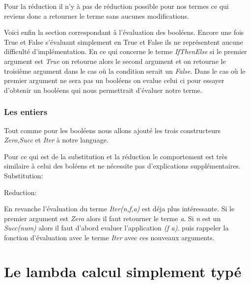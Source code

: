 \documentclass {article}
\newcommand{\codefrom}[3]
           {}
\theoremstyle{definition}
\theoremstyle{remark}
\begin{document}
\codefrom{untyped}{lambda}{bool_substitution}

Pour la réduction il n'y à pas de réduction possible pour nos termes
ce qui reviens donc a retourner le terme sans aucunes modifications.


Voici enfin la section correspondant à l'évaluation des booléens.
Encore une fois True et False s'évaluant simplement en True et False ils
ne représentent aucune difficulté d'implémentation. En ce qui concerne
le terme \emph{IfThenElse} si le premier argument est \emph{True}
on retourne alors le second argument et on retourne le troisième argument 
dans le cas où la condition serait un \emph{False}. Dans le cas 
où le premier argument ne sera pas un booléens on evalue celui ci pour 
essayer d'obtenir un booléens qui nous permettrait d'évaluer notre 
terme.

\codefrom{untyped}{lambda}{bool_evaluation}


\subsubsection{Les entiers}

Tout comme pour les booléens nous allons ajouté les trois constructeurs 
\emph{Zero},\emph{Succ} et \emph{Iter} à notre language.

\codefrom{untyped}{lambda}{nat_term}

Pour ce qui est de la substitution et la réduction le comportement est très
similaire à celui des boléens et ne nécessite pas d'explications supplémentaires.
Substitution:

\codefrom{untyped}{lambda}{nat_substitution}

Reduction:

\codefrom{untyped}{lambda}{nat_reduction}

En revanche l'évaluation du terme \emph{Iter(n,f,a)} est déja plus intéressante.
Si le premier argument est \emph{Zero} alors il faut retourner le terme \emph{a}.
Si \emph{n} est un \emph{Succ(num)} alors il faut d'abord evaluer l'application 
\emph{(f a)}. puis rappeler la fonction d'évaluation avec le terme 
\emph{Iter} avec ces nouveaux arguments.

\codefrom{untyped}{lambda}{nat_evaluation}

\section{Le lambda calcul simplement typé}
\end{document}
